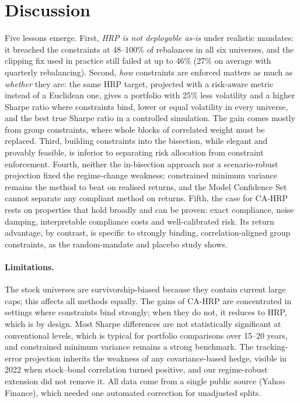 \FloatBarrier


\FloatBarrier


\FloatBarrier
\section{Discussion}\label{sec:discussion}
Five lessons emerge. First, \emph{HRP is not deployable as-is} under realistic mandates: it
breached the constraints at 48--100\% of rebalances in all six universes, and the clipping
fix used in practice still failed at up to 46\% (27\% on average with quarterly
rebalancing). Second, \emph{how} constraints are enforced matters as much as \emph{whether}
they are: the same HRP target, projected with a risk-aware metric instead of a Euclidean one,
gives a portfolio with 25\% less volatility and a higher Sharpe ratio where constraints bind,
lower or equal volatility in every universe, and the best true Sharpe ratio in a controlled
simulation. The gain comes mostly from group constraints, where whole blocks of correlated
weight must be replaced. Third, building constraints into the bisection, while elegant and
provably feasible, is inferior to separating risk allocation from constraint enforcement.
Fourth, neither the in-bisection approach nor a scenario-robust projection fixed the
regime-change weakness; constrained minimum variance remains the method to beat on
realised returns, and the Model Confidence Set cannot separate any compliant method on
returns. Fifth, the case for CA-HRP rests on properties that hold broadly and can be proven:
exact compliance, noise damping, interpretable compliance costs and well-calibrated risk.
Its return advantage, by contrast, is specific to strongly binding, correlation-aligned group
constraints, as the random-mandate and placebo study shows.

\paragraph{Limitations.} The stock universes are survivorship-biased because they contain
current large caps; this affects all methods equally. The gains of CA-HRP are concentrated
in settings where constraints bind strongly; when they do not, it reduces to HRP, which is
by design. Most Sharpe differences are not statistically significant at conventional
levels, which is typical for portfolio comparisons over 15--20 years, and constrained
minimum variance remains a strong benchmark. The tracking-error projection inherits the
weakness of any covariance-based hedge, visible in 2022 when stock--bond correlation turned
positive, and our regime-robust extension did not remove it. All data come from a single
public source (Yahoo Finance), which needed one automated correction for unadjusted splits.
